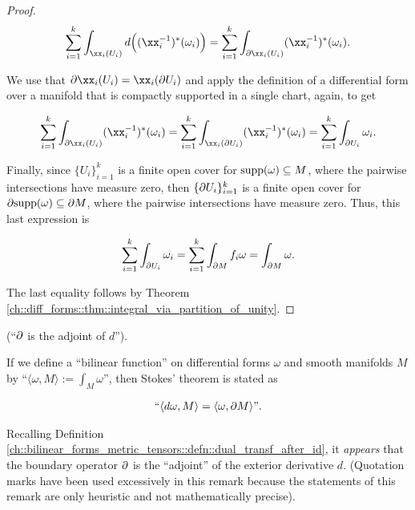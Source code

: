 \begin{proof}
    \begin{align*}
        \sum_{i = 1}^k \int_{\xx_i(U_i)} d \Big( (\xx_i^{-1})^*(\omega_i) \Big) = \sum_{i = 1}^k \int_{\pd \xx_i(U_i)} (\xx_i^{-1})^*(\omega_i).
    \end{align*}
    
    We use that $\pd \xx_i(U_i) = \xx_i(\pd U_i)$ and apply the definition of a differential form over a manifold that is compactly supported in a single chart, again, to get
    
    \begin{align*}
        \sum_{i = 1}^k \int_{\pd \xx_i(U_i)} (\xx_i^{-1})^*(\omega_i) = \sum_{i = 1}^k \int_{\xx_i(\pd U_i)} (\xx_i^{-1})^*(\omega_i) = \sum_{i = 1}^k \int_{\pd U_i} \omega_i.
    \end{align*}
    
    Finally, since $\{U_i\}_{i = 1}^k$ is a finite open cover for $\text{supp}(\omega) \subseteq M$, where the pairwise intersections have measure zero, then $\{\partial U_i\}_{i = 1}^k$ is a finite open cover for $\partial \text{supp}(\omega) \subseteq \partial M$, where the pairwise intersections have measure zero. Thus, this last expression is
    
    \begin{align*}
        \sum_{i = 1}^k \int_{\partial U_i} \omega_i = \sum_{i = 1}^k \int_{\partial M} f_i \omega = \int_{\partial M} \omega.
    \end{align*}
    
    The last equality follows by Theorem \ref{ch::diff_forms::thm::integral_via_partition_of_unity}.
\end{proof}

    

\begin{remark}
    (``$\partial$ is the adjoint of $d$'').
    
    If we define a ``bilinear function'' on differential forms $\omega$ and smooth manifolds $M$ by ``${\langle \omega, M \rangle := \int_M \omega}$'', then Stokes' theorem is stated as
    
    \begin{align*}
        ``\langle d \omega, M \rangle = \langle \omega, \partial M \rangle \text{''}.
    \end{align*}
    
    Recalling Definition \ref{ch::bilinear_forms_metric_tensors::defn::dual_transf_after_id}, it \textit{appears} that the boundary operator $\partial$ is the ``adjoint'' of the exterior derivative $d$. (Quotation marks have been used excessively in this remark because the statements of this remark are only heuristic and not mathematically precise).
    
    
\end{remark}

